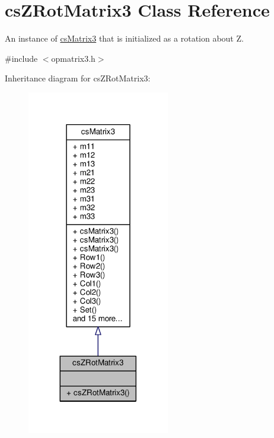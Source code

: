\hypertarget{classcsZRotMatrix3}{}\section{cs\+Z\+Rot\+Matrix3 Class Reference}
\label{classcsZRotMatrix3}


An instance of \hyperlink{classcsMatrix3}{cs\+Matrix3} that is initialized as a rotation about Z.  




{\ttfamily \#include $<$opmatrix3.\+h$>$}



Inheritance diagram for cs\+Z\+Rot\+Matrix3\+:
\nopagebreak
\begin{figure}[H]
\begin{center}
\leavevmode
\includegraphics[width=176pt]{d9/d0b/classcsZRotMatrix3__inherit__graph}
\end{center}
\end{figure}


